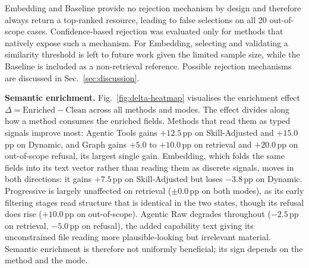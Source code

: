 \documentclass[10pt,twocolumn]{article}
\begin{document}
Embedding and Baseline provide no rejection mechanism by design and therefore always return a top-ranked resource, leading to false selections on all 20 out-of-scope cases. Confidence-based rejection was evaluated only for methods that natively expose such a mechanism. For Embedding, selecting and validating a similarity threshold is left to future work given the limited sample size, while the Baseline is included as a non-retrieval reference. Possible rejection mechanisms are discussed in Sec.~\ref{sec:discussion}. 


\textbf{Semantic enrichment.} Fig.~\ref{fig:delta-heatmap} visualises the enrichment effect $\Delta = \text{Enriched} - \text{Clean}$ across all methods and modes. The effect divides along how a method consumes the enriched fields. Methods that read them as typed signals improve most: Agentic Tools gains $+12.5$\,pp on Skill-Adjusted and $+15.0$\,pp on Dynamic, and Graph gains $+5.0$ to $+10.0$\,pp on retrieval and $+20.0$\,pp on out-of-scope refusal, its largest single gain. Embedding, which folds the same fields into its text vector rather than reading them as discrete signals, moves in both directions: it gains $+7.5$\,pp on Skill-Adjusted but loses $-3.8$\,pp on Dynamic. Progressive is largely unaffected on retrieval ($\pm 0.0$\,pp on both modes), as its early filtering stages read structure that is identical in the two states, though its refusal does rise ($+10.0$\,pp on out-of-scope). Agentic Raw degrades throughout ($-2.5$\,pp on retrieval, $-5.0$\,pp on refusal), the added capability text giving its unconstrained file reading more plausible-looking but irrelevant material. Semantic enrichment is therefore not uniformly beneficial; its sign depends on the method and the mode.
\end{document}
